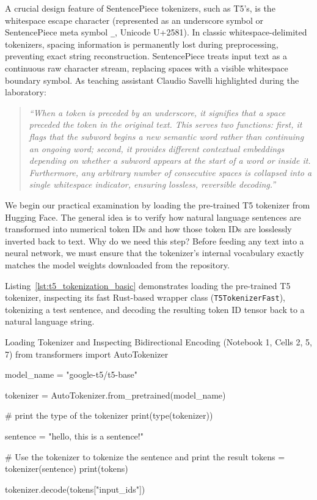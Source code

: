 \documentclass[11pt,a4paper]{article}
\begin{document}
A crucial design feature of SentencePiece tokenizers, such as T5's, is the whitespace escape character (represented as an underscore symbol or SentencePiece meta symbol \texttt{\_}, Unicode U+2581). In classic whitespace-delimited tokenizers, spacing information is permanently lost during preprocessing, preventing exact string reconstruction. SentencePiece treats input text as a continuous raw character stream, replacing spaces with a visible whitespace boundary symbol. As teaching assistant Claudio Savelli highlighted during the laboratory:
\begin{quote}
\emph{``When a token is preceded by an underscore, it signifies that a space preceded the token in the original text. This serves two functions: first, it flags that the subword begins a new semantic word rather than continuing an ongoing word; second, it provides different contextual embeddings depending on whether a subword appears at the start of a word or inside it. Furthermore, any arbitrary number of consecutive spaces is collapsed into a single whitespace indicator, ensuring lossless, reversible decoding.''}
\end{quote}

We begin our practical examination by loading the pre-trained T5 tokenizer from Hugging Face. The general idea is to verify how natural language sentences are transformed into numerical token IDs and how those token IDs are losslessly inverted back to text. Why do we need this step? Before feeding any text into a neural network, we must ensure that the tokenizer's internal vocabulary exactly matches the model weights downloaded from the repository.

Listing~\ref{lst:t5_tokenization_basic} demonstrates loading the pre-trained T5 tokenizer, inspecting its fast Rust-based wrapper class (\texttt{T5TokenizerFast}), tokenizing a test sentence, and decoding the resulting token ID tensor back to a natural language string.

\begin{solutioncode}[label=lst:t5_tokenization_basic]{Loading Tokenizer and Inspecting Bidirectional Encoding (Notebook 1, Cells 2, 5, 7)}
from transformers import AutoTokenizer

model_name = "google-t5/t5-base"

tokenizer = AutoTokenizer.from_pretrained(model_name)

# print the type of the tokenizer
print(type(tokenizer))

sentence = "hello, this is a sentence!"

# Use the tokenizer to tokenize the sentence and print the result
tokens = tokenizer(sentence)
print(tokens)

tokenizer.decode(tokens["input_ids"])
\end{solutioncode}
\end{document}
